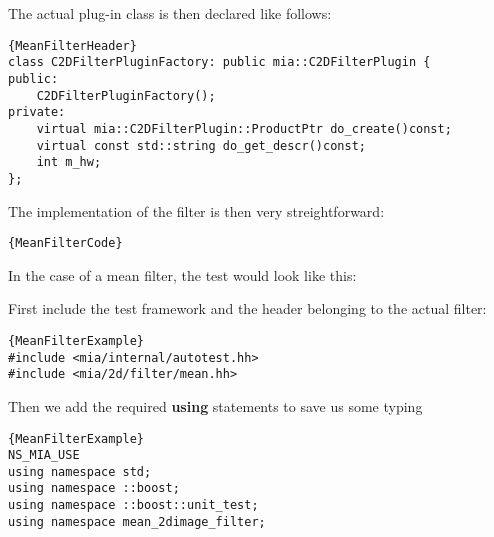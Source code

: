 \documentclass[english, 10pt, a4paper,headsepline,openany]{scrbook}
\begin{document}
The actual plug-in class is then declared like follows: 
\begin{lstlisting}{MeanFilterHeader}
class C2DFilterPluginFactory: public mia::C2DFilterPlugin {
public:
	C2DFilterPluginFactory();
private:
	virtual mia::C2DFilterPlugin::ProductPtr do_create()const;
	virtual const std::string do_get_descr()const;
	int m_hw;
};
\end{lstlisting}

The implementation of the filter is then very streightforward: 
\begin{lstlisting}{MeanFilterCode}

\end{lstlisting}





In the case of a mean filter, the test would look like this: 

First include the test framework and the header belonging to the actual filter: 
\lstset{numbers=left,firstnumber=auto}
\begin{lstlisting}{MeanFilterExample}
#include <mia/internal/autotest.hh>
#include <mia/2d/filter/mean.hh>
\end{lstlisting}

\noindent
Then we add the required {\bf using} statements to save us some typing
\begin{lstlisting}{MeanFilterExample}
NS_MIA_USE
using namespace std;
using namespace ::boost;
using namespace ::boost::unit_test;
using namespace mean_2dimage_filter;
\end{lstlisting}
\end{document}

